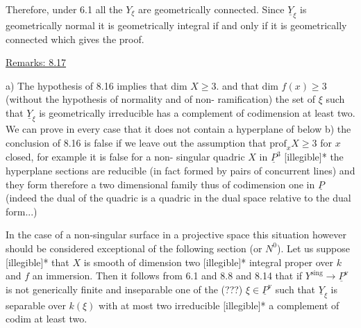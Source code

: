 
Therefore, under 6.1 all the $Y_\xi$ are geometrically connected.
Since $\underline{Y}_\xi$ is geometrically normal it is geometrically integral if
and only if it is geometrically connected which gives the proof.

\uline{Remarks: 8.17}

a) The hypothesis of 8.16 implies that dim $X \geq 3$. and that
dim $f(x) \geq 3$ (without the hypothesis of normality and of non-%
ramification) the set of $\xi$ such that $\underline{Y}_\xi$ is geometrically
irreducible has a complement of codimension at least two. We can
prove in every case that it does not contain a hyperplane of below
b) the conclusion of 8.16 is false if we leave out the assumption
that $\mathrm{prof}_x X \geq 3$ for $x$ closed, for example it is false for a non-%
singular quadric $X$ in $\underline{P}^3$ [illegible]*
the hyperplane sections are reducible (in fact formed by pairs of
concurrent lines) and they form therefore a two dimensional family
thus of codimension one in $\underline{P}$ (indeed the dual of the quadric is a
quadric in the dual space relative to the dual form...)

In the case of a non-singular surface in a projective space
this situation however should be considered exceptional of the
following section (or $N^0$). Let us suppose [illegible]* that $X$ is
smooth of dimension two [illegible]* integral proper over $k$ and $f$
an immersion. Then it follows from 6.1 and 8.8 and 8.14 that if
$Y^{\mathrm{sing}} \to \underline{P}^{\mathrm{v}}$ is not generically finite and inseparable one of the
(???) $\xi \in \underline{P}^{\mathrm{v}}$ such that $\underline{Y}_\xi$ is separable over $k(\xi)$ with at most two
irreducible [illegible]* a complement of codim at least two.

